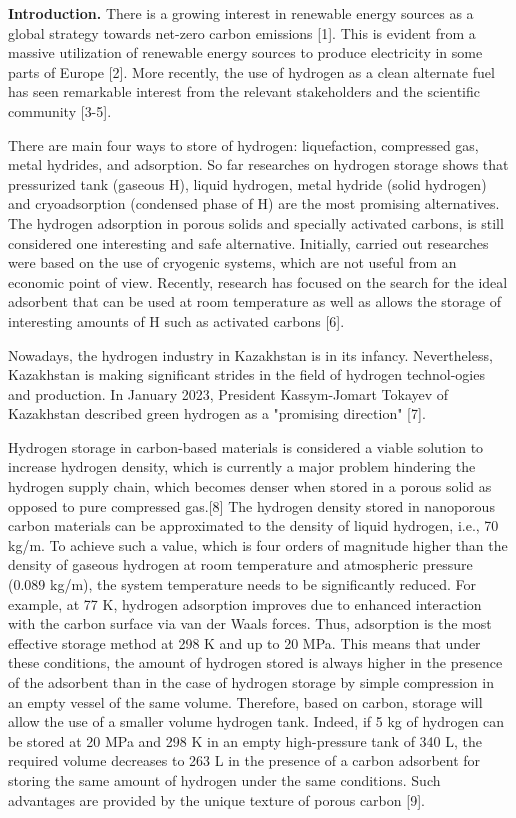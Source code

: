 \begin{multicols}{2}
{\bfseries Introduction.} There is a growing interest in renewable energy
sources as a global strategy towards net-zero carbon emissions {[}1{]}.
This is evident from a massive utilization of renewable energy sources
to produce electricity in some parts of Europe {[}2{]}. More recently,
the use of hydrogen as a clean alternate fuel has seen remarkable
interest from the relevant stakeholders and the scientific community
{[}3-5{]}.

There are main four ways to store of hydrogen: liquefaction, compressed
gas, metal hydrides, and adsorption. So far researches on hydrogen
storage shows that pressurized tank (gaseous H), liquid
hydrogen, metal hydride (solid hydrogen) and cryoadsorption (condensed
phase of H) are the most promising alternatives. The
hydrogen adsorption in porous solids and specially activated carbons, is
still considered one interesting and safe alternative. Initially,
carried out researches were based on the use of cryogenic systems, which
are not useful from an economic point of view. Recently, research has
focused on the search for the ideal adsorbent that can be used at room
temperature as well as allows the storage of interesting amounts of
H such as activated carbons {[}6{]}.

Nowadays, the hydrogen industry in Kazakhstan is in its infancy.
Nevertheless, Kazakhstan is making significant strides in the field of
hydrogen technol-ogies and production. In January 2023, President
Kassym-Jomart Tokayev of Kazakhstan described green hydrogen as a
"promising direction" {[}7{]}.

Hydrogen storage in carbon-based materials is considered a viable
solution to increase hydrogen density, which is currently a major
problem hindering the hydrogen supply chain, which becomes denser when
stored in a porous solid as opposed to pure compressed gas.{[}8{]} The
hydrogen density stored in nanoporous carbon materials can be
approximated to the density of liquid hydrogen, i.e., 70
kg/m. To achieve such a value, which is four orders
of magnitude higher than the density of gaseous hydrogen at room
temperature and atmospheric pressure (0.089 kg/m),
the system temperature needs to be significantly reduced. For example,
at 77 K, hydrogen adsorption improves due to enhanced interaction with
the carbon surface via van der Waals forces. Thus, adsorption is the
most effective storage method at 298 K and up to 20 MPa. This means that
under these conditions, the amount of hydrogen stored is always higher
in the presence of the adsorbent than in the case of hydrogen storage by
simple compression in an empty vessel of the same volume. Therefore,
based on carbon, storage will allow the use of a smaller volume hydrogen
tank. Indeed, if 5 kg of hydrogen can be stored at 20 MPa and 298 K in
an empty high-pressure tank of 340 L, the required volume decreases to
263 L in the presence of a carbon adsorbent for storing the same amount
of hydrogen under the same conditions. Such advantages are provided by
the unique texture of porous carbon {[}9{]}.


\end{multicols}
